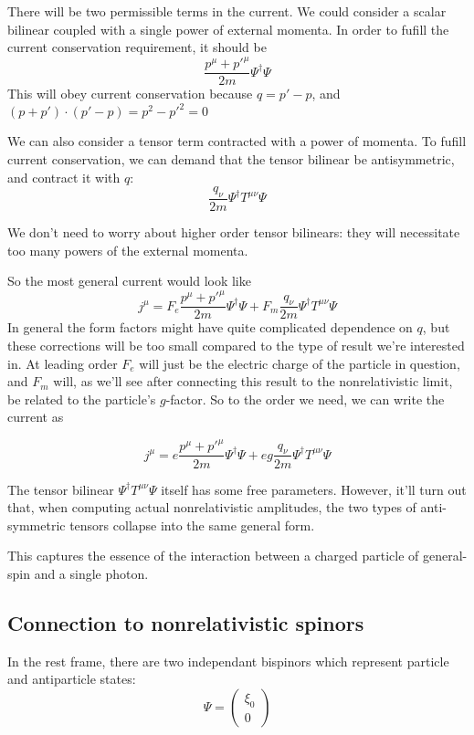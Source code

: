 There will be two permissible terms in the current.  We could consider a scalar bilinear coupled with a single power of external momenta.  In order to fufill the current conservation requirement, it should be
\[
	\frac{p^\mu + p'^\mu}{2m} \Psi^\dagger \Psi
\]
This will obey current conservation because $q = p' -p$, and $ (p+p')\cdot(p'-p) = p^2-p'^2=0$

We can also consider a tensor term contracted with a power of momenta.  To fufill current conservation, we can demand that the tensor bilinear be antisymmetric, and contract it with $q$:
\[
	\frac{q_\nu}{2m} \Psi^\dagger T^{\mu\nu} \Psi
\]

We don't need to worry about higher order tensor bilinears: they will necessitate too many powers of the external momenta.

So the most general current would look like
\[
	j^\mu = F_e \frac{p^\mu + p'^\mu}{2m} \Psi^\dagger \Psi + F_m 	\frac{q_\nu}{2m} \Psi^\dagger T^{\mu\nu} \Psi	
\]
In general the form factors might have quite complicated dependence on $q$, but these corrections will be too small compared to the type of result we're interested in.  At leading order $F_e$ will just be the electric charge of the particle in question, and $F_m$ will, as we'll see after connecting this result to the nonrelativistic limit, be related to the particle's $g$-factor.  So to the order we need, we can write the current as

\[
	j^\mu =  e \frac{p^\mu + p'^\mu}{2m} \Psi^\dagger \Psi +   e g \frac{q_\nu}{2m} \Psi^\dagger T^{\mu\nu} \Psi
\]

The tensor bilinear $\Psi^\dagger T^{\mu\nu} \Psi$ itself has some free parameters.  However, it'll turn out that, when computing actual nonrelativistic amplitudes, the two types of anti-symmetric tensors collapse into the same general form.

This captures the essence of the interaction between a charged particle of general-spin and a single photon.


\subsection{Connection to nonrelativistic spinors}
In the rest frame, there are two independant bispinors which represent particle and antiparticle states: 
\[
	\Psi = \begin{pmatrix} \xi_0 \\ 0 \end{pmatrix}
\]

